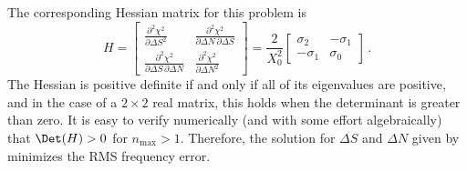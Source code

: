 The corresponding Hessian matrix for this problem is
 \begin{equation}
H = \begin{bmatrix}
      \frac{\partial^2 \chi^2}{\partial \Delta S^2} & \frac{\partial^2 \chi^2}{\partial \Delta N\, \partial \Delta S} \\
      \frac{\partial^2 \chi^2}{\partial \Delta S\, \partial \Delta N} & \frac{\partial^2 \chi^2}{\partial \Delta N^2}
    \end{bmatrix}
  = \frac{2}{X_0^2} \begin{bmatrix}
      \sigma_2 & -\sigma_1 \\
      -\sigma_1 & \sigma_0
    \end{bmatrix}\, .
 \end{equation}
The Hessian is positive definite if and only if all of its eigenvalues are positive, and in the case of a $2 \times 2$ real matrix, this holds when the determinant is greater than zero. It is easy to verify numerically (and with some effort algebraically) that $\Det(H) > 0$ for $n_\text{max} > 1$. Therefore, the solution for $\Delta S$ and $\Delta N$ given by  minimizes the RMS frequency error. 